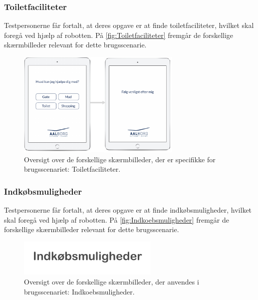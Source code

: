 \subsubsection*{Toiletfaciliteter}
%
Testpersonerne får fortalt, at deres opgave er at finde toiletfaciliteter, hvilket skal foregå ved hjælp af robotten. På \autoref{fig:Toiletfaciliteter} fremgår de forskellige skærmbilleder relevant for dette brugsscenarie. 
%
\begin{figure}[H]
\centering
\includegraphics[width = 0.7\textwidth]{Figure/Toiletfaciliteter} 
\caption{Oversigt over de forskellige skærmbilleder, der er specifikke for brugsscenariet: Toiletfaciliteter.}
\label{fig:Toiletfaciliteter}
\end{figure}
\noindent
%  
\subsubsection*{Indkøbsmuligheder}
Testpersonerne får fortalt, at deres opgave er at finde indkøbsmuligheder, hvilket skal foregå ved hjælp af robotten. På \autoref{fig:Indkoebsmuligheder} fremgår de forskellige skærmbilleder relevant for dette brugsscenarie. 
%
\begin{figure}[H]
\centering
\includegraphics[width = 0.6\textwidth]{Figure/Indkoebsmuligheder} 
\caption{Oversigt over de forskellige skærmbilleder, der anvendes i brugsscenariet: Indkoebsmuligheder.}
\label{fig:Indkoebsmuligheder}
\end{figure}
\noindent
% 

